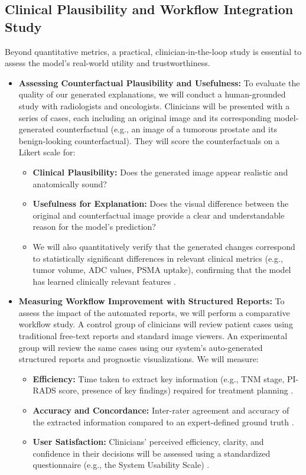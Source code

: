 \documentclass[11pt, a4paper]{article}
\begin{document}
\subsection{Clinical Plausibility and Workflow Integration Study}
Beyond quantitative metrics, a practical, clinician-in-the-loop study is essential to assess the model's real-world utility and trustworthiness.
\begin{itemize}
    \item \textbf{Assessing Counterfactual Plausibility and Usefulness:} To evaluate the quality of our generated explanations, we will conduct a human-grounded study with radiologists and oncologists. Clinicians will be presented with a series of cases, each including an original image and its corresponding model-generated counterfactual (e.g., an image of a tumorous prostate and its benign-looking counterfactual). They will score the counterfactuals on a Likert scale for:
    \begin{itemize}
        \item \textbf{Clinical Plausibility:} Does the generated image appear realistic and anatomically sound? \cite{GuoDeng2024, RossiLopez2024}
        \item \textbf{Usefulness for Explanation:} Does the visual difference between the original and counterfactual image provide a clear and understandable reason for the model's prediction? \cite{SinglaEslami2021, Singla2022}
        \item We will also quantitatively verify that the generated changes correspond to statistically significant differences in relevant clinical metrics (e.g., tumor volume, ADC values, PSMA uptake), confirming that the model has learned clinically relevant features \cite{SinglaEslami2021, Singla2022}.
    \end{itemize}
    \item \textbf{Measuring Workflow Improvement with Structured Reports:} To assess the impact of the automated reports, we will perform a comparative workflow study. A control group of clinicians will review patient cases using traditional free-text reports and standard image viewers. An experimental group will review the same cases using our system's auto-generated structured reports and prognostic visualizations. We will measure:
    \begin{itemize}
        \item \textbf{Efficiency:} Time taken to extract key information (e.g., TNM stage, PI-RADS score, presence of key findings) required for treatment planning \cite{UnknownAuthor2020}.
        \item \textbf{Accuracy and Concordance:} Inter-rater agreement and accuracy of the extracted information compared to an expert-defined ground truth \cite{UnknownAuthor2020}.
        \item \textbf{User Satisfaction:} Clinicians' perceived efficiency, clarity, and confidence in their decisions will be assessed using a standardized questionnaire (e.g., the System Usability Scale) \cite{SinglaEslami2021, Singla2022}.
    \end{itemize}
\end{itemize}
\end{document}
